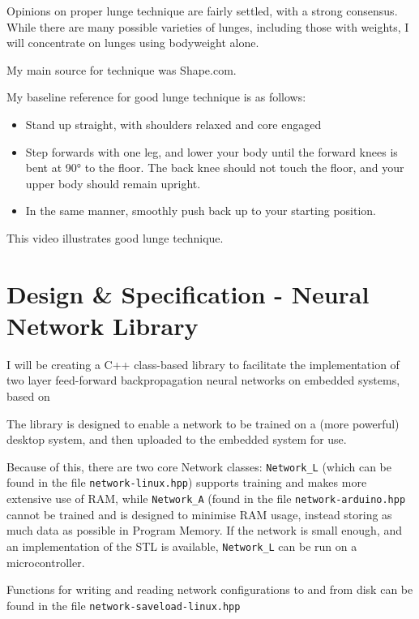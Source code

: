\documentclass[a4paper]{article}
\begin{document}
Opinions on proper lunge technique are fairly settled, with a strong consensus. While there are many possible varieties of lunges, including those with weights, I will concentrate on lunges using bodyweight alone.

My main source for technique was Shape.com\cite{bgref24}.

My baseline reference for good lunge technique is as follows:

\begin{itemize}
    \item Stand up straight, with shoulders relaxed and core engaged
    \item Step forwards with one leg, and lower your body until the forward knees is bent at 90° to the floor. The back knee should not touch the floor, and your upper body should remain upright.
    \item In the same manner, smoothly push back up to your starting position.
\end{itemize}

This video\cite{bgref25} illustrates good lunge technique.

\newpage
\section{Design \& Specification - Neural Network Library}

I will be creating a C++ class-based library to facilitate the implementation of two layer feed-forward backpropagation neural networks on embedded systems, based on 

The library is designed to enable a network to be trained on a (more powerful) desktop system, and then uploaded to the embedded system for use.

Because of this, there are two core Network classes: \lstinline{Network_L} (which can be found in the file \lstinline{network-linux.hpp}) supports training and makes more extensive use of RAM, while \lstinline{Network_A} (found in the file \lstinline{network-arduino.hpp} cannot be trained and is designed to minimise RAM usage, instead storing as much data as possible in Program Memory. If the network is small enough, and an implementation of the STL is available, \lstinline{Network_L} can be run on a microcontroller.

Functions for writing and reading network configurations to and from disk can be found in the file \lstinline{network-saveload-linux.hpp}
\end{document}
